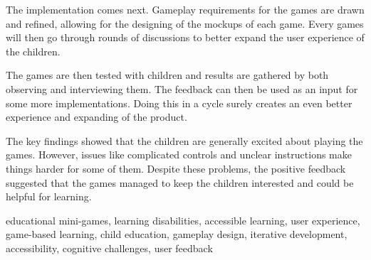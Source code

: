 The implementation comes next. Gameplay requirements for the games are drawn and refined, allowing for the designing of the mockups of each game. Every games will then go through rounds of discussions to better expand the user experience of the children.

The games are then tested with children and results are gathered by both observing and interviewing them. The feedback can then be used as an input for some more implementations. Doing this in a cycle surely creates an even better experience and expanding of the product.

The key findings showed that the children are generally excited about playing the games. However, issues like complicated controls and unclear instructions make things harder for some of them. Despite these problems, the positive feedback suggested that the games managed to keep the children interested and could be helpful for learning.


\begin{keywords}
	educational mini-games, learning disabilities, accessible learning, user experience, game-based learning, child education, gameplay design, iterative development, accessibility, cognitive challenges, user feedback
\end{keywords} 
